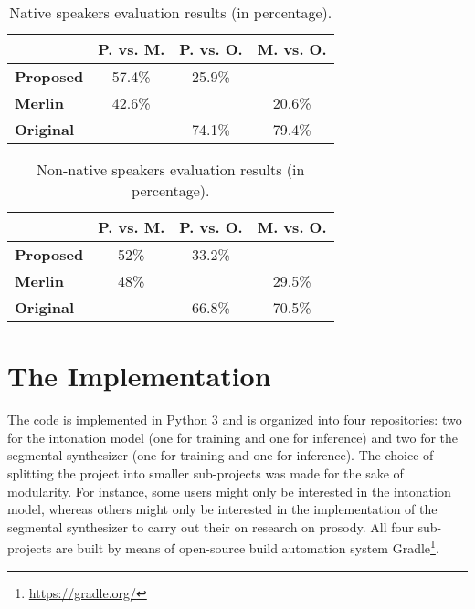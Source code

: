\begin{table}[h!]
  \centering
  \begin{tabular}{lccc}
    \toprule

     & {\bf P. vs. M.} & {\bf P. vs. O.} & {\bf M. vs. O.} \\
     \midrule
     
    {\bf Proposed} & 57.4\% & 25.9\% &  \\  

    {\bf Merlin} & 42.6\% &  & 20.6\% \\     
    
    {\bf Original} & & 74.1\% & 79.4\% \\  
    \bottomrule
    \end{tabular}
  \caption{Native speakers evaluation results (in percentage).}
  \label{tab:perc-native-eval-result}
\end{table}


\begin{table}[h!]
  \centering
  \begin{tabular}{lccc}
    \toprule

     & {\bf P. vs. M.} & {\bf P. vs. O.} & {\bf M. vs. O.} \\
     \midrule
     
    {\bf Proposed} & 52\% & 33.2\% &  \\  

    {\bf Merlin} & 48\% &  & 29.5\% \\     
    
    {\bf Original} & & 66.8\% & 70.5\% \\  
    \bottomrule
    
    \end{tabular}
  \caption{Non-native speakers evaluation results (in percentage).}
  \label{tab:perc-non-native-eval-result}
\end{table}


\chapter{The Implementation}

The code is implemented in Python 3 and is organized into four repositories: two for the intonation model (one for training and one for inference) and two for the segmental synthesizer (one for training and one for inference).
The choice of splitting the project into smaller sub-projects was made for the sake of modularity.
For instance, some users might only be interested in the intonation model, whereas others might only be interested in the implementation of the segmental synthesizer to carry out their on research on prosody.
All four sub-projects are built by means of open-source build automation system Gradle\footnote{\url{https://gradle.org/}}.


